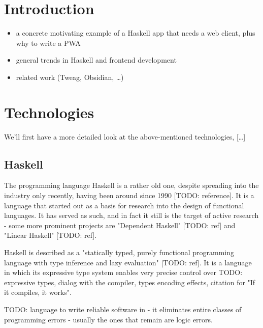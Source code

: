\documentclass[english,odsaz]{fitthesis}
\date{\today}
\title{}
\begin{document}
\maketitle
\setlength{\parskip}{0pt}
{\hypersetup{hidelinks}\tableofcontents}
\iftotalfigures\listoffigures\fi
\iftotaltables\listoftables\fi
\iftwoside\cleardoublepage\fi
\setlength{\parskip}{0.5\bigskipamount}

\chapter{Introduction}
\label{sec:org06f850b}
\begin{itemize}
\item a concrete motivating example of a Haskell app that needs a web client, plus
why to write a PWA
\item general trends in Haskell and frontend development
\item related work (Tweag, Obsidian, \ldots{})
\end{itemize}

\chapter{Technologies}
\label{sec:org94b3c11}
We'll first have a more detailed look at the above-mentioned technologies, [\ldots{}]

\section{Haskell}
\label{sec:org72a8337}
The programming language Haskell is a rather old one, despite spreading into the
industry only recently, having been around since 1990 [TODO: reference]. It is a
language that started out as a basis for research into the design of functional
languages. It has served as such, and in fact it still is the target of active
research - some more prominent projects are "Dependent Haskell" [TODO: ref] and
"Linear Haskell" [TODO: ref].

Haskell is described as a "statically typed, purely functional programming
language with type inference and lazy evaluation" [TODO: ref]. It is a language
in which its expressive type system enables very precise control over TODO:
expressive types, dialog with the compiler, types encoding effects, citation for
"If it compiles, it works".

TODO: language to write reliable software in - it eliminates entire classes of
programming errors - usually the ones that remain are logic errors.
\end{document}
